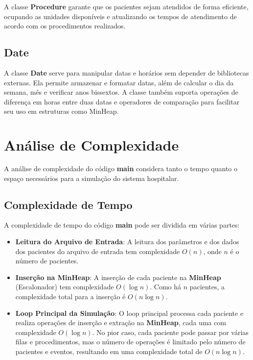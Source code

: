\documentclass[a4paper,12pt]{article}
\begin{document}
A classe \textbf{Procedure} garante que os pacientes sejam atendidos de forma eficiente, ocupando as unidades disponíveis e atualizando os tempos de atendimento de acordo com os procedimentos realizados.

\subsection{Date}
A classe \textbf{Date} serve para manipular datas e horários sem depender de bibliotecas externas. 
Ela permite armazenar e formatar datas, além de calcular o dia da semana, mês e verificar anos bissextos. 
A classe também suporta operações de diferença em horas entre duas datas e operadores de comparação para facilitar seu uso em estruturas como MinHeap.

\section{Análise de Complexidade}
\hspace*{1cm}
A análise de complexidade do código \textbf{main} considera tanto o tempo quanto o espaço necessários para a simulação do sistema hospitalar.

\subsection{Complexidade de Tempo}
A complexidade de tempo do código \textbf{main} pode ser dividida em várias partes:

\begin{itemize}
    \item \textbf{Leitura do Arquivo de Entrada}: A leitura dos parâmetros e dos dados dos pacientes do arquivo de entrada tem complexidade $O(n)$, onde $n$ é o número de pacientes.
    \item \textbf{Inserção na MinHeap}: A inserção de cada paciente na \textbf{MinHeap} (Escalonador) tem complexidade $O(\log n)$. Como há $n$ pacientes, a complexidade total para a inserção é $O(n \log n)$.
    \item \textbf{Loop Principal da Simulação}: O loop principal processa cada paciente e realiza operações de inserção e extração na \textbf{MinHeap}, cada uma com complexidade $O(\log n)$. No pior caso, cada paciente pode passar por várias filas e procedimentos, mas o número de operações é limitado pelo número de pacientes e eventos, resultando em uma complexidade total de $O(n \log n)$.
\end{itemize}
\end{document}
